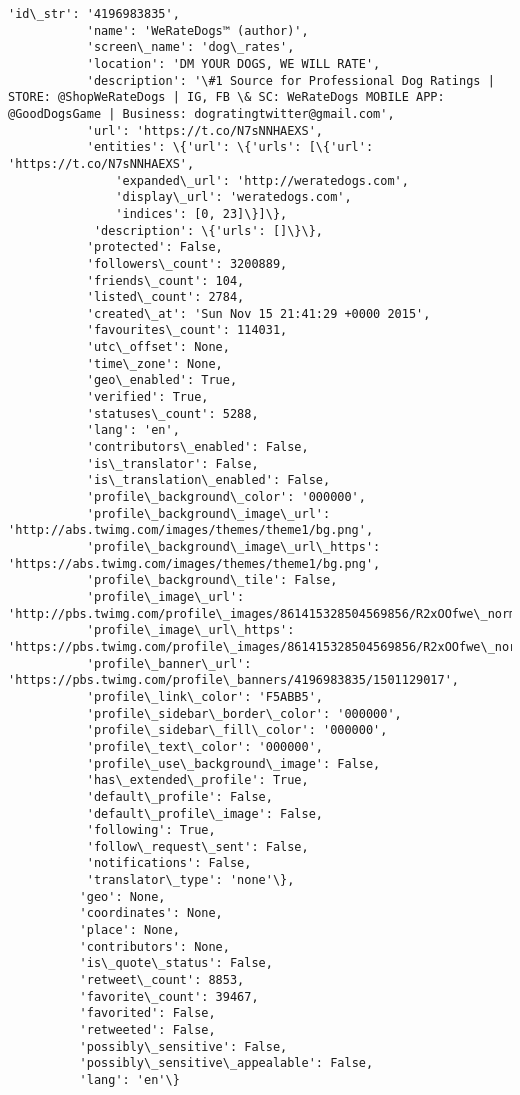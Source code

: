 \documentclass[11pt]{article}
\begin{document}
\begin{Verbatim}[commandchars=\\\{\}]
           'id\_str': '4196983835',
           'name': 'WeRateDogs™ (author)',
           'screen\_name': 'dog\_rates',
           'location': 'DM YOUR DOGS, WE WILL RATE',
           'description': '\#1 Source for Professional Dog Ratings | STORE: @ShopWeRateDogs | IG, FB \& SC: WeRateDogs MOBILE APP: @GoodDogsGame | Business: dogratingtwitter@gmail.com',
           'url': 'https://t.co/N7sNNHAEXS',
           'entities': \{'url': \{'urls': [\{'url': 'https://t.co/N7sNNHAEXS',
               'expanded\_url': 'http://weratedogs.com',
               'display\_url': 'weratedogs.com',
               'indices': [0, 23]\}]\},
            'description': \{'urls': []\}\},
           'protected': False,
           'followers\_count': 3200889,
           'friends\_count': 104,
           'listed\_count': 2784,
           'created\_at': 'Sun Nov 15 21:41:29 +0000 2015',
           'favourites\_count': 114031,
           'utc\_offset': None,
           'time\_zone': None,
           'geo\_enabled': True,
           'verified': True,
           'statuses\_count': 5288,
           'lang': 'en',
           'contributors\_enabled': False,
           'is\_translator': False,
           'is\_translation\_enabled': False,
           'profile\_background\_color': '000000',
           'profile\_background\_image\_url': 'http://abs.twimg.com/images/themes/theme1/bg.png',
           'profile\_background\_image\_url\_https': 'https://abs.twimg.com/images/themes/theme1/bg.png',
           'profile\_background\_tile': False,
           'profile\_image\_url': 'http://pbs.twimg.com/profile\_images/861415328504569856/R2xOOfwe\_normal.jpg',
           'profile\_image\_url\_https': 'https://pbs.twimg.com/profile\_images/861415328504569856/R2xOOfwe\_normal.jpg',
           'profile\_banner\_url': 'https://pbs.twimg.com/profile\_banners/4196983835/1501129017',
           'profile\_link\_color': 'F5ABB5',
           'profile\_sidebar\_border\_color': '000000',
           'profile\_sidebar\_fill\_color': '000000',
           'profile\_text\_color': '000000',
           'profile\_use\_background\_image': False,
           'has\_extended\_profile': True,
           'default\_profile': False,
           'default\_profile\_image': False,
           'following': True,
           'follow\_request\_sent': False,
           'notifications': False,
           'translator\_type': 'none'\},
          'geo': None,
          'coordinates': None,
          'place': None,
          'contributors': None,
          'is\_quote\_status': False,
          'retweet\_count': 8853,
          'favorite\_count': 39467,
          'favorited': False,
          'retweeted': False,
          'possibly\_sensitive': False,
          'possibly\_sensitive\_appealable': False,
          'lang': 'en'\}
\end{Verbatim}
            
\end{document}
